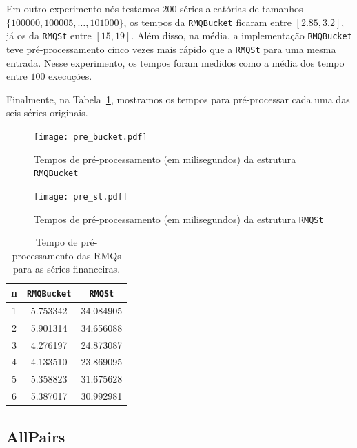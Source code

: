 \documentclass[12pt]{article}
\begin{document}
Em outro experimento nós testamos $200$ séries aleatórias de tamanhos $\{100000, 100005, \ldots, 101000\}$,
os tempos da {\tt RMQBucket} ficaram entre $[2.85, 3.2]$, já os da {\tt RMQSt} entre $[15,19]$. 
Além disso, na média, a implementação {\tt RMQBucket} teve pré-processamento cinco vezes mais rápido
que a {\tt RMQSt} para uma mesma entrada. Nesse experimento, os tempos foram medidos como a média
dos tempo entre $100$ execuções.

Finalmente, na Tabela~\ref{tab:pre_series}, mostramos os tempos para pré-processar cada uma das seis
séries originais.


\begin{figure}[htp]
\begin{center}
\texttt{[image: pre\_bucket.pdf]}
\caption{Tempos de pré-processamento (em milisegundos) da estrutura {\tt RMQBucket} }
\label{fig:pre_bucket}
\end{center}
\end{figure}

\begin{figure}[htp]
\begin{center}
\texttt{[image: pre\_st.pdf]}
\caption{Tempos de pré-processamento (em milisegundos) da estrutura {\tt RMQSt} }
\label{fig:pre_st}
\end{center}
\end{figure}

\begin{table}
\small
\begin{center}
\begin{tabular}{|c|c|c|}
\hline
\textbf{n} & \textbf{ {\tt RMQBucket} } & \textbf{ {\tt RMQSt}}\\
\hline
1 & 5.753342 & 34.084905\\
\hline
2 & 5.901314 & 34.656088\\
\hline
3 & 4.276197 & 24.873087\\
\hline 
4 & 4.133510 & 23.869095\\
\hline
5 & 5.358823 & 31.675628\\
\hline
6 & 5.387017 & 30.992981\\
\hline
\end{tabular}
\end{center}
\label{tab:pre_series}
\caption{Tempo de pré-processamento das RMQs para as séries financeiras.}
\normalsize
\end{table}


\subsection{AllPairs}
\end{document}
